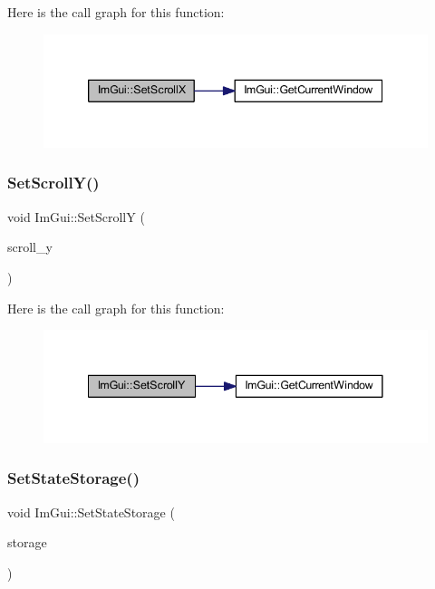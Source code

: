 Here is the call graph for this function\+:
\nopagebreak
\begin{figure}[H]
\begin{center}
\leavevmode
\includegraphics[width=339pt]{namespace_im_gui_a0796750de8c50555d895f63e79ac87f0_cgraph}
\end{center}
\end{figure}
\mbox{\label{namespace_im_gui_a41833555962807384432e6fc94d46ec9}} 
\subsubsection{\texorpdfstring{Set\+Scroll\+Y()}{SetScrollY()}}
{\footnotesize\ttfamily void Im\+Gui\+::\+Set\+ScrollY (\begin{DoxyParamCaption}\item[{float}]{scroll\+\_\+y }\end{DoxyParamCaption})}

Here is the call graph for this function\+:
\nopagebreak
\begin{figure}[H]
\begin{center}
\leavevmode
\includegraphics[width=341pt]{namespace_im_gui_a41833555962807384432e6fc94d46ec9_cgraph}
\end{center}
\end{figure}
\mbox{\label{namespace_im_gui_a5ba1bf82e3ecdd09dcb6ad733bcf5726}} 
\subsubsection{\texorpdfstring{Set\+State\+Storage()}{SetStateStorage()}}
{\footnotesize\ttfamily void Im\+Gui\+::\+Set\+State\+Storage (\begin{DoxyParamCaption}\item[{\mbox{\hyperlink{struct_im_gui_storage}{Im\+Gui\+Storage}} $\ast$}]{storage }\end{DoxyParamCaption})}

